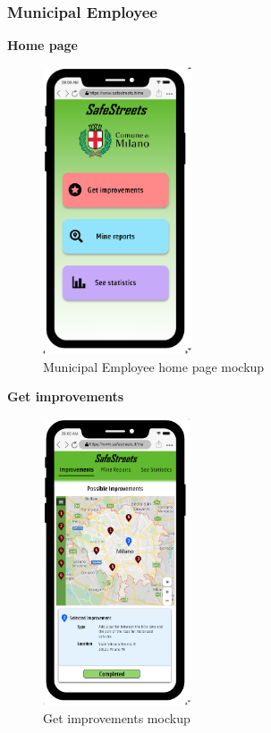 				\subsubsection{Municipal Employee}
					\begin{center}
						{\small \textbf{Home page}}
					\end{center}
					\vspace{-5mm}
					\begin{figure}[!h]
						\centering
						\includegraphics[height=8.5cm]{images/MockUp/Authority/MunicipalEmployee/HomePage.png}
						\caption{Municipal Employee home page mockup}
					\end{figure}
					\vspace{-1mm}
					\begin{center}
						{\small \textbf{Get improvements}}
					\end{center}
					\vspace{-5mm}
					\begin{figure}[!h]
						\centering
						\includegraphics[height=8.5cm]{images/MockUp/Authority/MunicipalEmployee/Improvements.png}
						\caption{Get improvements mockup}
					\end{figure}
					\clearpage
					

